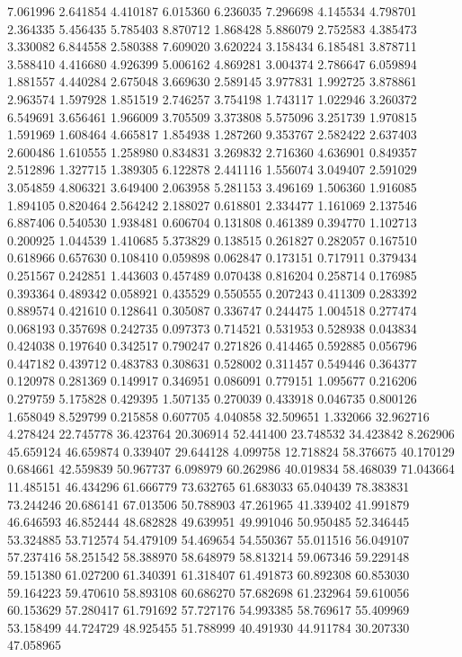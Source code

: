 7.061996
2.641854
4.410187
6.015360
6.236035
7.296698
4.145534
4.798701
2.364335
5.456435
5.785403
8.870712
1.868428
5.886079
2.752583
4.385473
3.330082
6.844558
2.580388
7.609020
3.620224
3.158434
6.185481
3.878711
3.588410
4.416680
4.926399
5.006162
4.869281
3.004374
2.786647
6.059894
1.881557
4.440284
2.675048
3.669630
2.589145
3.977831
1.992725
3.878861
2.963574
1.597928
1.851519
2.746257
3.754198
1.743117
1.022946
3.260372
6.549691
3.656461
1.966009
3.705509
3.373808
5.575096
3.251739
1.970815
1.591969
1.608464
4.665817
1.854938
1.287260
9.353767
2.582422
2.637403
2.600486
1.610555
1.258980
0.834831
3.269832
2.716360
4.636901
0.849357
2.512896
1.327715
1.389305
6.122878
2.441116
1.556074
3.049407
2.591029
3.054859
4.806321
3.649400
2.063958
5.281153
3.496169
1.506360
1.916085
1.894105
0.820464
2.564242
2.188027
0.618801
2.334477
1.161069
2.137546
6.887406
0.540530
1.938481
0.606704
0.131808
0.461389
0.394770
1.102713
0.200925
1.044539
1.410685
5.373829
0.138515
0.261827
0.282057
0.167510
0.618966
0.657630
0.108410
0.059898
0.062847
0.173151
0.717911
0.379434
0.251567
0.242851
1.443603
0.457489
0.070438
0.816204
0.258714
0.176985
0.393364
0.489342
0.058921
0.435529
0.550555
0.207243
0.411309
0.283392
0.889574
0.421610
0.128641
0.305087
0.336747
0.244475
1.004518
0.277474
0.068193
0.357698
0.242735
0.097373
0.714521
0.531953
0.528938
0.043834
0.424038
0.197640
0.342517
0.790247
0.271826
0.414465
0.592885
0.056796
0.447182
0.439712
0.483783
0.308631
0.528002
0.311457
0.549446
0.364377
0.120978
0.281369
0.149917
0.346951
0.086091
0.779151
1.095677
0.216206
0.279759
5.175828
0.429395
1.507135
0.270039
0.433918
0.046735
0.800126
1.658049
8.529799
0.215858
0.607705
4.040858
32.509651
1.332066
32.962716
4.278424
22.745778
36.423764
20.306914
52.441400
23.748532
34.423842
8.262906
45.659124
46.659874
0.339407
29.644128
4.099758
12.718824
58.376675
40.170129
0.684661
42.559839
50.967737
6.098979
60.262986
40.019834
58.468039
71.043664
11.485151
46.434296
61.666779
73.632765
61.683033
65.040439
78.383831
73.244246
20.686141
67.013506
50.788903
47.261965
41.339402
41.991879
46.646593
46.852444
48.682828
49.639951
49.991046
50.950485
52.346445
53.324885
53.712574
54.479109
54.469654
54.550367
55.011516
56.049107
57.237416
58.251542
58.388970
58.648979
58.813214
59.067346
59.229148
59.151380
61.027200
61.340391
61.318407
61.491873
60.892308
60.853030
59.164223
59.470610
58.893108
60.686270
57.682698
61.232964
59.610056
60.153629
57.280417
61.791692
57.727176
54.993385
58.769617
55.409969
53.158499
44.724729
48.925455
51.788999
40.491930
44.911784
30.207330
47.058965
